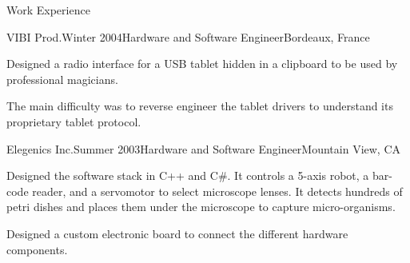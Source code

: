 \documentclass{resume} %
\newcommand{\supelec}{{Sup\'{e}lec}\xspace}
\begin{document}
\begin{rSection}{Work Experience}

\begin{rSubsection}{VIBI Prod.}{Winter 2004}{Hardware and Software Engineer}{Bordeaux, France}
\item Designed a radio interface for a USB tablet hidden in a clipboard to be used by professional magicians.
\item The main difficulty was to reverse engineer the tablet drivers to understand its proprietary tablet protocol.
\end{rSubsection}

\begin{rSubsection}{Elegenics Inc.}{Summer 2003}{Hardware and Software Engineer}{Mountain View, CA}
\item Designed the software stack in C++ and C\#. It controls a 5-axis
      robot, a bar-code reader, and a servomotor to select microscope lenses.
      It detects hundreds of petri dishes and places them under the
      microscope to capture micro-organisms.
\item Designed a custom electronic board to connect the different hardware components.
\end{rSubsection}

\end{rSection}

\end{document}
